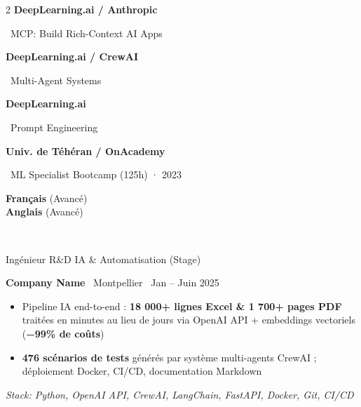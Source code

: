 \documentclass[7pt,a4paper,withhyper]{altacv}
\renewcommand{\cvevent}[4]{%
  {\large\color{emphasis}\raggedright #1\par}
  \smallskip\normalsize
  \ifstrequal{#2}{}{}{%
    \textbf{\color{accent}#2}%
  }%
  \ifstrequal{#4}{}{}{%
    \ifstrequal{#2}{}{}{\hspace{1.5em}}%
    {\small\cvLocationMarker~#4}%
  }%
  \ifstrequal{#3}{}{}{%
    \hfill{\small\cvDateMarker~#3}%
  }\par
}
\begin{document}
\begin{paracol}{2}
\vspace{0.2em}
\smallskip
\noindent\textbf{DeepLearning.ai / Anthropic}\par
\hspace{1em}\raisebox{0.15ex}{\textcolor{accent}{\scriptsize\faStar}}~MCP: Build Rich-Context AI Apps\par
\vspace{0.2em}
\noindent\textbf{DeepLearning.ai / CrewAI}\par
\hspace{1em}\raisebox{0.15ex}{\textcolor{accent}{\scriptsize\faStar}}~Multi-Agent Systems\par
\vspace{0.2em}
\noindent\textbf{DeepLearning.ai}\par
\hspace{1em}\raisebox{0.15ex}{\textcolor{accent}{\scriptsize\faStar}}~Prompt Engineering\par
\vspace{0.2em}
\noindent\textbf{Univ. de Téhéran / OnAcademy}\par
\hspace{1em}\raisebox{0.15ex}{\textcolor{accent}{\scriptsize\faStar}}~ML Specialist Bootcamp (125h) · 2023\par
\hspace{1em}{Python ML · Neural Networks · Computer Vision}\par

\vspace{0.2em}
\textbf{Français} (Avancé)\\\vspace{0.1em}
\textbf{Anglais} (Avancé)\\\vspace{0.1em}\par

\vspace{0.2em}
 \\[-0.15em]
 \par

\switchcolumn
\vspace{-0.5em}


\cvevent{Ingénieur R\&D IA \& Automatisation (Stage)}{Company Name}{Jan – Juin 2025}{Montpellier}
\smallskip
\begin{itemize}[leftmargin=1.25em, itemsep=0pt, parsep=0pt]
\item \justifying Pipeline IA end-to-end : \textbf{18 000+ lignes Excel \& 1 700+ pages PDF} traitées en minutes au lieu de jours via OpenAI API + embeddings vectoriels (\textbf{−99\% de coûts})
\item \justifying \textbf{476 scénarios de tests} générés par système multi-agents CrewAI ; déploiement Docker, CI/CD, documentation Markdown
\end{itemize}
\smallskip\noindent\textit{Stack: Python, OpenAI API, CrewAI, LangChain, FastAPI, Docker, Git, CI/CD}\par


\end{paracol}
\end{document}

